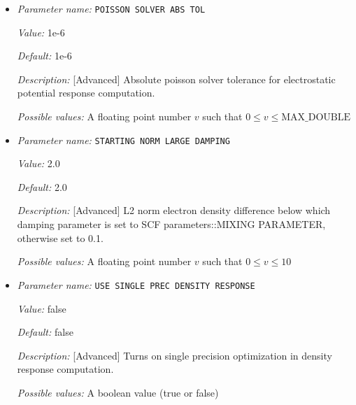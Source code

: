 \begin{itemize}
{\it Value:} ADAPTIVE


{\it Default:} ADAPTIVE


{\it Description:} [Advanced] Method subtype for LOW_RANK_DIELECM_PRECOND.


{\it Possible values:} Any one of ADAPTIVE, ACCUMULATED\_ADAPTIVE
\item {\it Parameter name:} {\tt POISSON SOLVER ABS TOL}
\label{parameters:SCF parameters/LOW RANK DIELECM PRECOND/POISSON SOLVER ABS TOL}
\label{parameters:SCF_20parameters/LOW_20RANK_20DIELECM_20PRECOND/POISSON_20SOLVER_20ABS_20TOL}


{\it Value:} 1e-6


{\it Default:} 1e-6


{\it Description:} [Advanced] Absolute poisson solver tolerance for electrostatic potential response computation.


{\it Possible values:} A floating point number $v$ such that $0 \leq v \leq \text{MAX\_DOUBLE}$
\item {\it Parameter name:} {\tt STARTING NORM LARGE DAMPING}
\label{parameters:SCF parameters/LOW RANK DIELECM PRECOND/STARTING NORM LARGE DAMPING}
\label{parameters:SCF_20parameters/LOW_20RANK_20DIELECM_20PRECOND/STARTING_20NORM_20LARGE_20DAMPING}


{\it Value:} 2.0


{\it Default:} 2.0


{\it Description:} [Advanced] L2 norm electron density difference below which damping parameter is set to SCF parameters::MIXING PARAMETER, otherwise set to 0.1.


{\it Possible values:} A floating point number $v$ such that $0 \leq v \leq 10$
\item {\it Parameter name:} {\tt USE SINGLE PREC DENSITY RESPONSE}
\label{parameters:SCF parameters/LOW RANK DIELECM PRECOND/USE SINGLE PREC DENSITY RESPONSE}
\label{parameters:SCF_20parameters/LOW_20RANK_20DIELECM_20PRECOND/USE_20SINGLE_20PREC_20DENSITY_20RESPONSE}


{\it Value:} false


{\it Default:} false


{\it Description:} [Advanced] Turns on single precision optimization in density response computation.


{\it Possible values:} A boolean value (true or false)
\end{itemize}
